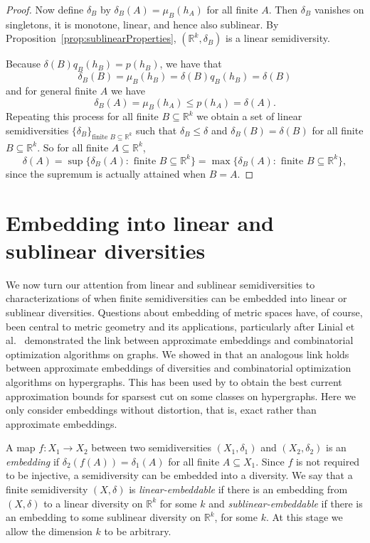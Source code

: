 \documentclass[11pt]{article}
\renewcommand{\Re}{\mathbb{R}}
\begin{document}
\begin{proof}
Now define $\delta_B$ by $\delta_B(A)=\mu_B(h_A)$ for all finite $A$. Then $\delta_B$ vanishes on singletons, it is monotone, linear, and hence also sublinear. By Proposition~\ref{prop:sublinearProperties}, $(\Re^k,\delta_B)$ is a linear semidiversity.

Because $\delta(B) q_B(h_B)=p(h_B)$, we have that 
\[\delta_B(B)=\mu_B(h_B) = \delta(B) q_B(h_B)=\delta(B)\]
and for general finite $A$ we have 
\[\delta_B(A) =\mu_B(h_A) \leq p(h_A) = \delta(A).\]
Repeating this process for all finite $B \subseteq \Re^k$ we obtain a set of linear semidiversities $\{\delta_B\}_{\text{finite } B \subseteq \Re^k}$ such that $\delta_B \leq \delta$ and $\delta_B(B) = \delta(B)$ for all finite $B  \subseteq \Re^k$. So for all finite $A \subseteq \Re^k$,
\[\delta(A) = \sup\{\delta_B(A) : \mbox{ finite } B \subseteq \Re^k \} = \max\{\delta_B(A) : \mbox{ finite } B \subseteq \Re^k \}, \] 
since the supremum is actually attained when $B=A$.
\end{proof}




\section{Embedding into linear and sublinear diversities} \label{sec:embedding}



We now turn our attention from linear and sublinear semidiversities to characterizations  of when finite semidiversities can be  
embedded into linear or sublinear diversities. Questions about embedding of metric spaces have, of course, been central to metric geometry and its applications, particularly after Linial et al.\ \cite{LinialLondonEtal95} demonstrated the link between approximate embeddings and combinatorial optimization algorithms on graphs. We showed in \cite{BryantTupper14} that an analogous link holds between approximate embeddings of diversities and combinatorial optimization algorithms on hypergraphs. This has been used by \cite{jozefiak2023diversity} to obtain the best current approximation bounds for sparsest cut on some classes on hypergraphs. Here we only consider embeddings without distortion, that is, exact rather than approximate embeddings.

A map $f:X_1 \to X_2$ between two semidiversities $(X_1,\delta_1)$ and $(X_2,\delta_2)$ is an {\em embedding} if $\delta_2(f(A)) = \delta_1(A)$ for all finite $A \subseteq X_1$. Since $f$ is not required to be injective, a semidiversity can be embedded into a diversity. We say that a finite semidiversity $(X,\delta)$ is {\em linear-embeddable} if there is an embedding from $(X,\delta)$ to a linear diversity on $\Re^k$ for some $k$ and {\em sublinear-embeddable} if there is an embedding to some sublinear diversity on $\mathbb{R}^k$, for some $k$. At this stage we allow the dimension $k$ to be arbitrary. 
\end{document}
